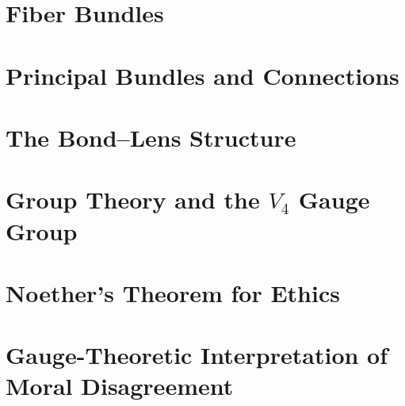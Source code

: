 \documentclass[12pt,letterpaper,twoside,openright]{book}
\theoremstyle{plain}
\theoremstyle{definition}
\theoremstyle{remark}
\newcommand{\calB}{\mathcal{B}}
\newcommand{\calM}{\mathcal{M}}
\begin{document}
\section{Fiber Bundles}

\section{Principal Bundles and Connections}

\section{The Bond--Lens Structure}

\section{Group Theory and the $V_4$ Gauge Group}

\section{Noether's Theorem for Ethics}

\section{Gauge-Theoretic Interpretation of Moral Disagreement}
\end{document}
